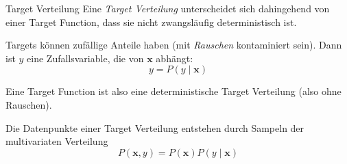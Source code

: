 \begin{defi}{Target Verteilung}
    Eine \emph{Target Verteilung} unterscheidet sich dahingehend von einer Target Function, dass sie nicht zwangsläufig deterministisch ist.

    Targets können zufällige Anteile haben (mit \emph{Rauschen} kontaminiert sein).
    Dann ist $y$ eine Zufallsvariable, die von $\mathbf{x}$ abhängt:
    \[
        y = P(y \mid \mathbf{x})
    \]

    Eine Target Function ist also eine deterministische Target Verteilung (also ohne Rauschen).

    Die Datenpunkte einer Target Verteilung entstehen durch Sampeln der multivariaten Verteilung
    \[
        P(\mathbf{x}, y) = P(\mathbf{x}) P(y \mid \mathbf{x})
    \]
\end{defi}

